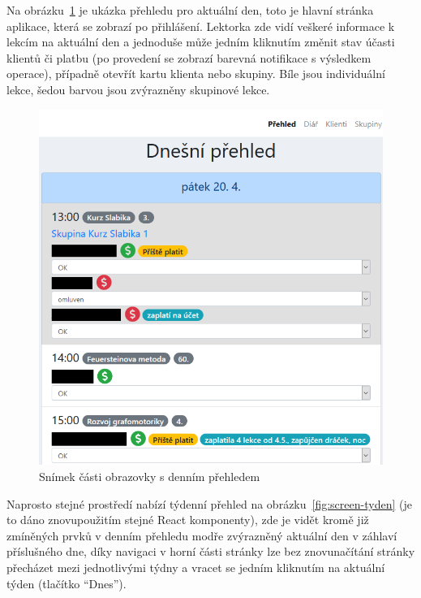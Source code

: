     Na obrázku~\ref{fig:screen-den} je ukázka přehledu pro aktuální den, toto je hlavní stránka aplikace, která se zobrazí po přihlášení. Lektorka zde vidí veškeré informace k lekcím na aktuální den a jednoduše může jedním kliknutím změnit stav účasti klientů či platbu (po provedení se zobrazí barevná notifikace s výsledkem operace), případně otevřít kartu klienta nebo skupiny. Bíle jsou individuální lekce, šedou barvou jsou zvýrazněny skupinové lekce.
    
        \begin{figure}[hb]\centering
        	\includegraphics[width=1\textwidth]{img/screenshoty/screen-den-orez.png}
        	\caption{Snímek části obrazovky s denním přehledem}\label{fig:screen-den}
        \end{figure}
    
    Naprosto stejné prostředí nabízí týdenní přehled na obrázku~\ref{fig:screen-tyden} (je to dáno znovupoužitím stejné React komponenty), zde je vidět kromě již zmíněných prvků v denním přehledu modře zvýrazněný aktuální den v záhlaví příslušného dne, díky navigaci v horní části stránky lze bez znovunačítání stránky přecházet mezi jednotlivými týdny a vracet se jedním kliknutím na aktuální týden (tlačítko \enquote{Dnes}).
        
